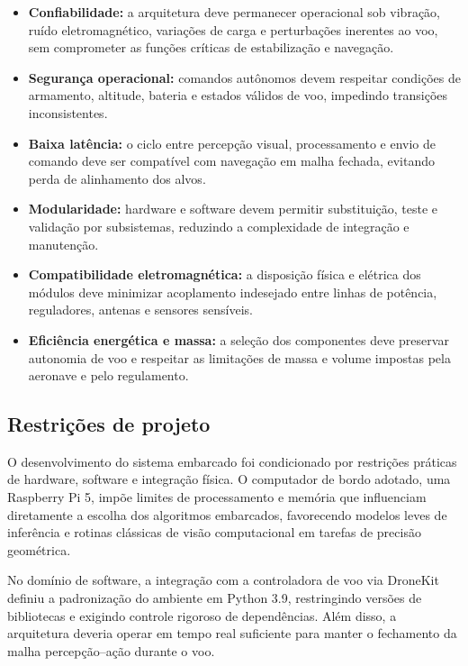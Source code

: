 \begin{itemize}
    \item \textbf{Confiabilidade:} a arquitetura deve permanecer operacional sob vibração, ruído eletromagnético, variações de carga e perturbações inerentes ao voo, sem comprometer as funções críticas de estabilização e navegação.
    \item \textbf{Segurança operacional:} comandos autônomos devem respeitar condições de armamento, altitude, bateria e estados válidos de voo, impedindo transições inconsistentes.
    \item \textbf{Baixa latência:} o ciclo entre percepção visual, processamento e envio de comando deve ser compatível com navegação em malha fechada, evitando perda de alinhamento dos alvos.
    \item \textbf{Modularidade:} hardware e software devem permitir substituição, teste e validação por subsistemas, reduzindo a complexidade de integração e manutenção.
    \item \textbf{Compatibilidade eletromagnética:} a disposição física e elétrica dos módulos deve minimizar acoplamento indesejado entre linhas de potência, reguladores, antenas e sensores sensíveis.
    \item \textbf{Eficiência energética e massa:} a seleção dos componentes deve preservar autonomia de voo e respeitar as limitações de massa e volume impostas pela aeronave e pelo regulamento.
\end{itemize}

\subsection{Restrições de projeto}

O desenvolvimento do sistema embarcado foi condicionado por restrições práticas de hardware, software e integração física. O computador de bordo adotado, uma Raspberry Pi 5, impõe limites de processamento e memória que influenciam diretamente a escolha dos algoritmos embarcados, favorecendo modelos leves de inferência e rotinas clássicas de visão computacional em tarefas de precisão geométrica.

No domínio de software, a integração com a controladora de voo via DroneKit definiu a padronização do ambiente em Python 3.9, restringindo versões de bibliotecas e exigindo controle rigoroso de dependências. Além disso, a arquitetura deveria operar em tempo real suficiente para manter o fechamento da malha percepção--ação durante o voo.

